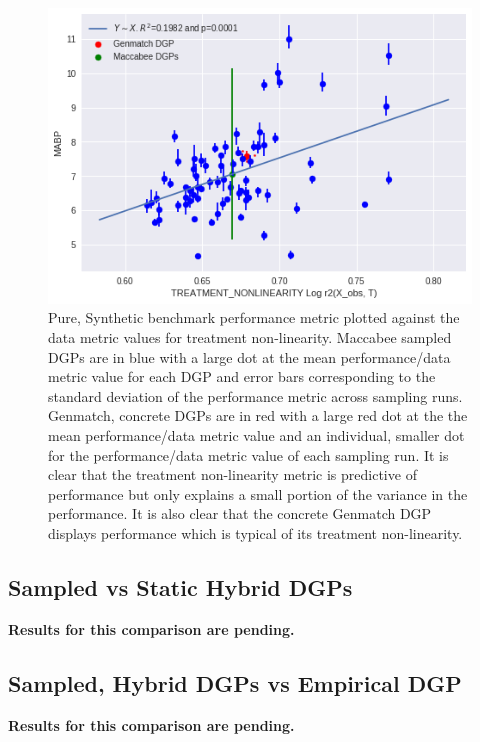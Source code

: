 \documentclass[../main.tex]{subfiles}
\begin{document}
\begin{figure}[ht!]
    \centering
    \includegraphics[width=1\linewidth]{figures/ch7-benchmark-pure-synth-2.png}
    \caption{Pure, Synthetic benchmark performance metric plotted against the data metric values for treatment non-linearity. Maccabee sampled DGPs are in blue with a large dot at the mean performance/data metric value for each DGP and error bars corresponding to the standard deviation of the performance metric across sampling runs. Genmatch, concrete DGPs are in red with a large red dot at the the mean performance/data metric value and an individual, smaller dot for the performance/data metric value of each sampling run. It is clear that the treatment non-linearity metric is predictive of performance but only explains a small portion of the variance in the performance. It is also clear that the concrete Genmatch DGP displays performance which is typical of its treatment non-linearity.}
    \label{fig:benchmark-validation-pure-synth-2}
\end{figure}
\FloatBarrier

\subsection{Sampled vs Static Hybrid DGPs}

\textbf{Results for this comparison are pending.}

\subsection{Sampled, Hybrid DGPs vs Empirical DGP}

\textbf{Results for this comparison are pending.}
\end{document}
